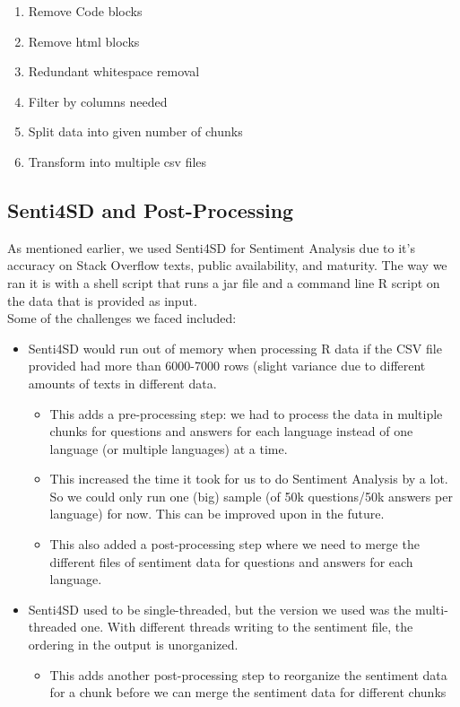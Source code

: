 \documentclass[conference]{IEEEtran}
\begin{document}
\begin{enumerate}
    \item Remove Code blocks
    \item Remove html blocks
    \item Redundant whitespace removal
    \item Filter by columns needed
    \item Split data into given number of chunks
    \item Transform into multiple csv files
\end{enumerate}

\subsection{Senti4SD and Post-Processing}
As mentioned earlier, we used Senti4SD for Sentiment Analysis due to it's accuracy on Stack Overflow texts, public availability, and maturity. The way we ran it is with a shell script that runs a jar file and a command line R script on the data that is provided as input.\\

Some of the challenges we faced included:
\begin{itemize}
    \item Senti4SD would run out of memory when processing R data if the CSV file provided had more than 6000-7000 rows (slight variance due to different amounts of texts in different data.
    \begin{itemize}
        \item This adds a pre-processing step: we had to process the data in multiple chunks for questions and answers for each language instead of one language (or multiple languages) at a time.
        \item This increased the time it took for us to do Sentiment Analysis by a lot. So we could only run one (big) sample (of 50k questions/50k answers per language) for now. This can be improved upon in the future.
        \item This also added a post-processing step where we need to merge the different files of sentiment data for questions and answers for each language.
    \end{itemize}
    \item Senti4SD used to be single-threaded, but the version we used was the multi-threaded one. With different threads writing to the sentiment file, the ordering in the output is unorganized. 
    \begin{itemize}
        \item This adds another post-processing step to reorganize the sentiment data for a chunk before we can merge the sentiment data for different chunks
    \end{itemize}
\end{itemize}
\end{document}
